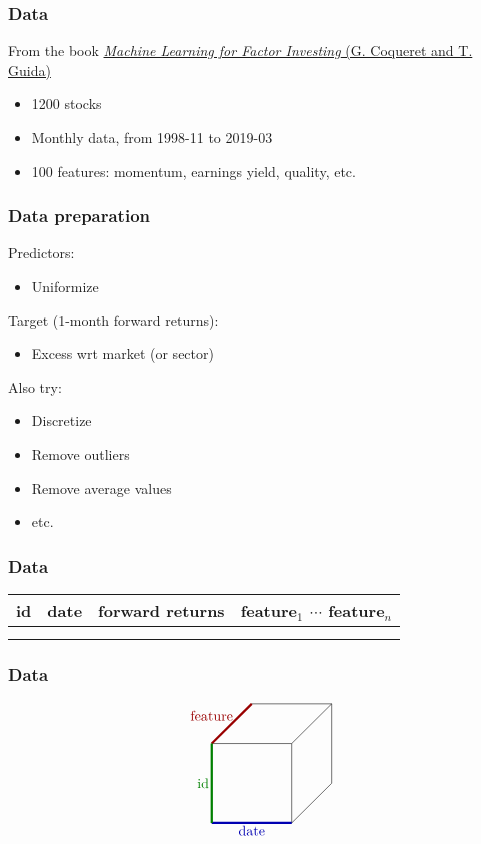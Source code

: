 \documentclass[a4paper,12pt,compress,serif]{beamer}
\begin{document}
\begin{frame}
  \frametitle{Data}
  From the book \href{http://www.mlfactor.com/}{\emph{Machine Learning for Factor Investing} (G. Coqueret and T. Guida)}
  \begin{itemize}
  \item 1200 stocks
  \item Monthly data, from 1998-11 to 2019-03
  \item 100 features: momentum, earnings yield, quality, etc.
  \end{itemize}
\end{frame}

\begin{frame}
  \frametitle{Data preparation}
  Predictors:
  \begin{itemize}
  \item Uniformize
  \end{itemize}

  \bigskip
  Target (1-month forward returns):
  \begin{itemize}
  \item Excess wrt market (or sector)
  \end{itemize}

  \bigskip
  Also try:
  \begin{itemize}
  \item Discretize
  \item Remove outliers
  \item Remove average values
  \item etc.
  \end{itemize}
\end{frame}

\begin{frame}
  \frametitle{Data}
  \centering
  \begin{tabular}{c|c|c|c}
    id & date & forward returns & feature$_1$ \quad $\cdots$ \quad feature$_n$ \\
    \hline
    &&& \\
    &&&
  \end{tabular}
\end{frame}

\begin{frame}
  \frametitle{Data}
\[
\begin{tikzpicture}[>=stealth,yscale=1,xscale=1,inner sep = 2pt, outer sep = 0pt,baseline=-7]
  \draw (0,0) -- (2,0) -- (2,2) -- (0,2) -- cycle;
  \draw (3,1) -- (3,3) -- (1,3);
  \draw (0,2) -- (1,3);
  \draw (2,0) -- (3,1);
  \draw (2,2) -- (3,3);
  \draw[ultra thick,red!60!black] (0,2) -- (1,3);
  \draw[ultra thick,blue!70!black] (0,0) -- (2,0);
  \draw[ultra thick,green!50!black] (0,0) -- (0,2);
  \node[anchor=north] at (1,0)    {\color{blue!70!black}date};
  \node[anchor=east]  at (0,1)    {\color{green!50!black}id};
  \node[anchor=east]  at (.6,2.7) {\color{red!60!black}feature};
\end{tikzpicture}
\]
\end{frame}
\end{document}

